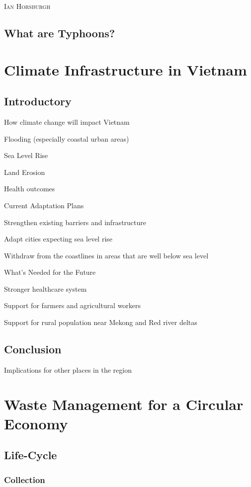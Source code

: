 \documentclass{book}\usepackage{knitr}
\makeatletter
\newcommand{\chapterauthor}[1]{%
  {\parindent0pt\vspace*{-25pt}%
  \linespread{1.1}\large\scshape#1%
  \par\nobreak\vspace*{35pt}}
  \@afterheading%
}
\makeatother
\begin{document}
\chapterauthor{Ian Horsburgh}

\section{What are Typhoons?}



\chapter{Climate Infrastructure in Vietnam}

\section{Introductory}

How climate change will impact Vietnam

Flooding (especially coastal urban areas)

Sea Level Rise

Land Erosion

Health outcomes

Current Adaptation Plans

Strengthen existing barriers and infrastructure

Adapt cities expecting sea level rise

Withdraw from the coastlines in areas that are well below sea level

What's Needed for the Future

Stronger healthcare system

Support for farmers and agricultural workers

Support for rural population near Mekong and Red river deltas

\section{Conclusion}

Implications for other places in the region


\chapter{Waste Management for a Circular Economy}

\section{Life-Cycle}

\subsection{Collection}
\end{document}
